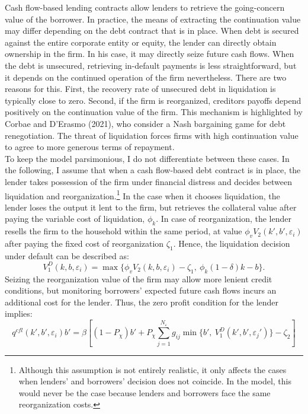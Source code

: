 \documentclass[12pt]{article}
\begin{document}
Cash flow-based lending contracts allow lenders to retrieve the going-concern value of the borrower. In practice, the means of extracting the continuation value may differ depending on the debt contract that is in place. When debt is secured against the entire corporate entity or equity, the lender can directly obtain ownership in the firm. In his case, it may directly seize future cash flows. When the debt is unsecured, retrieving in-default payments is less straightforward, but it depends on the continued operation of the firm nevertheless. There are two reasons for this. First, the recovery rate of unsecured debt in liquidation is typically close to zero. Second, if the firm is reorganized, creditors payoffs depend positively on the continuation value of the firm. This mechanism is highlighted by Corbae and D'Erasmo (2021), who consider a Nash bargaining game for debt renegotiation. The threat of liquidation forces firms with high continuation value to agree to more generous terms of repayment. \vspace{3mm} \\
To keep the model parsimonious, I do not differentiate between these cases. In the following, I assume that when a cash flow-based debt contract is in place, the lender takes possession of the firm under financial distress and decides between liquidation and reorganization.\footnote{Although this assumption is not entirely realistic, it only affects the cases when lenders' and borrowers' decision does not coincide. In the model, this would never be the case because lenders and borrowers face the same reorganization costs.} In the case when it chooses liquidation, the lender loses the output it lent to the firm, but retrieves the collateral value after paying the variable cost of liquidation, $\phi_k$. In case of reorganization, the lender resells the firm to the household within the same period, at value $\phi_v V_2(k', b',\varepsilon_i)$ after paying the fixed cost of reorganization $\zeta_1$. Hence, the liquidation decision under default can be described as: 
\begin{equation} \label{eq:VD_1}
V_1^D(k,b,\varepsilon_i) = \max \Big\{ \phi_vV_2(k,b,\varepsilon_i)- \zeta_1, \  \phi_k (1-\delta) k - b \Big\}.
\end{equation} 
Seizing the reorganization value of the firm may allow more lenient credit conditions, but monitoring borrowers' expected future cash flows incurs an additional cost for the lender. Thus, the zero profit condition for the lender implies: 
\begin{equation} \label{eq:q_cfl}
q^{cfl}(k',b',\varepsilon_i)b' = \beta \left[ (1-P_\chi) b' + P_\chi \sum_{j=1}^{N_\varepsilon} g_{ij}  \min\{b', \ V^D_1(k',b',\varepsilon_j')  \} - \zeta_2 \right] 
\end{equation}
\end{document}
